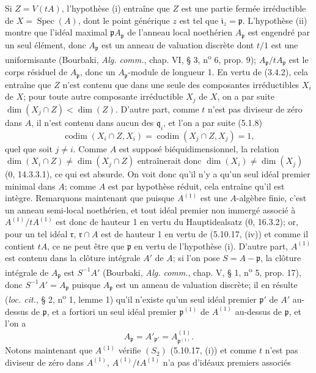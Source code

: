 Si $Z=V(tA)$, l'hypothèse (i) entraîne que $Z$ est une partie fermée
irréductible de $X=\operatorname{Spec}(A)$, dont le point générique $z$ est tel
que $\mathfrak i_z=\mathfrak p$. L'hypothèse (ii) montre que l'idéal maximal
$\mathfrak pA_{\mathfrak p}$ de l'anneau local noethérien $A_{\mathfrak p}$
est engendré par un seul élément, donc $A_{\mathfrak p}$ est un anneau de
valuation discrète dont $t/1$ est une uniformisante (Bourbaki, \emph{Alg.
comm.}, chap. VI, § 3, n\textsuperscript{o} 6, prop. 9);
$A_{\mathfrak p}/tA_{\mathfrak p}$ est le corps résiduel de
$A_{\mathfrak p}$, donc un $A_{\mathfrak p}$-module de longueur 1. En vertu de
(3.4.2), cela entraîne que $Z$ n'est contenu que dans une seule des composantes
irréductibles $X_i$ de $X$; pour toute autre composante irréductible $X_j$ de
$X$, on a par suite $\dim(X_j\cap Z)<\dim(Z)$. D'autre part, comme $t$ n'est
pas diviseur de zéro dans $A$, il n'est contenu dans aucun des
$\mathfrak q_i$, et l'on a par suite (5.1.8)
\[
\operatorname{codim}(X_i\cap Z,X_i)
=\operatorname{codim}(X_j\cap Z,X_j)=1,
\]
quel que soit $j\neq i$. Comme $A$ est supposé biéquidimensionnel, la relation
$\dim(X_i\cap Z)\neq\dim(X_j\cap Z)$ entraînerait donc
$\dim(X_i)\neq\dim(X_j)$ (0, 14.3.3.1), ce qui est absurde. On voit donc qu'il
n'y a qu'un seul idéal premier minimal dans $A$; comme $A$ est par hypothèse
réduit, cela entraîne qu'il est intègre. Remarquons maintenant que puisque
$A^{(1)}$ est une $A$-algèbre finie, c'est un anneau semi-local noethérien, et
tout idéal premier non immergé associé à $A^{(1)}/tA^{(1)}$ est donc de
hauteur 1 en vertu du Hauptidealsatz (0, 16.3.2); or, pour un tel idéal
$\mathfrak r$, $\mathfrak r\cap A$ est de hauteur 1 en vertu de (5.10.17,
(iv)) et comme il contient $tA$, ce ne peut être que $\mathfrak p$ en vertu de
l'hypothèse (i). D'autre part, $A^{(1)}$ est contenu dans la clôture intégrale
$A'$ de $A$; si l'on pose $S=A-\mathfrak p$, la clôture intégrale de
$A_{\mathfrak p}$ est $S^{-1}A'$ (Bourbaki, \emph{Alg. comm.}, chap. V, § 1,
n\textsuperscript{o} 5, prop. 17), donc $S^{-1}A'=A_{\mathfrak p}$ puisque
$A_{\mathfrak p}$ est un anneau de valuation discrète; il en résulte
(\emph{loc. cit.}, § 2, n\textsuperscript{o} 1, lemme 1) qu'il n'existe qu'un
seul idéal premier $\mathfrak p'$ de $A'$ au-dessus de $\mathfrak p$, et a
fortiori un seul idéal premier $\mathfrak p^{(1)}$ de $A^{(1)}$ au-dessus de
$\mathfrak p$, et l'on a
\[
A_{\mathfrak p}=A'_{\mathfrak p'}
=A^{(1)}_{\mathfrak p^{(1)}}.
\]
Notons maintenant que $A^{(1)}$ vérifie $(S_2)$ (5.10.17, (i)) et comme $t$
n'est pas diviseur de zéro dans $A^{(1)}$, $A^{(1)}/tA^{(1)}$ n'a pas
d'idéaux premiers associés

